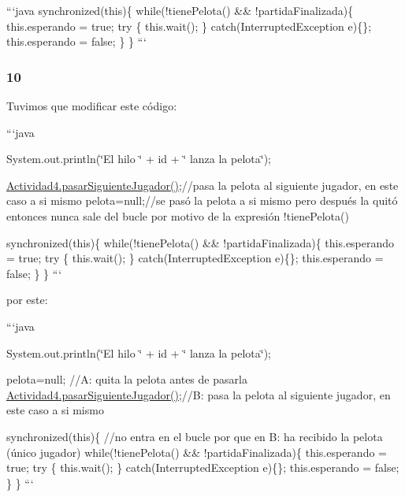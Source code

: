 ```java synchronized(this)\{ while(!tiene\-Pelota() \&\& !partida\-Finalizada)\{ this.\-esperando = true; try \{ this.\-wait(); \} catch(\-Interrupted\-Exception e)\{\}; this.\-esperando = false; \} \} ```

\subsubsection*{10}

Tuvimos que modificar este código\-:

```java

System.\-out.\-println(\char`\"{}\-El hilo \char`\"{} + id + \char`\"{} lanza la pelota\char`\"{});

\hyperlink{classActividad4_a23cf00e913eac32dea7597b617728047}{Actividad4.\-pasar\-Siguiente\-Jugador()};//pasa la pelota al siguiente jugador, en este caso a si mismo pelota=null;//se pasó la pelota a si mismo pero después la quitó entonces nunca sale del bucle por motivo de la expresión !tiene\-Pelota()

synchronized(this)\{ while(!tiene\-Pelota() \&\& !partida\-Finalizada)\{ this.\-esperando = true; try \{ this.\-wait(); \} catch(\-Interrupted\-Exception e)\{\}; this.\-esperando = false; \} \} ```

por este\-:

```java

System.\-out.\-println(\char`\"{}\-El hilo \char`\"{} + id + \char`\"{} lanza la pelota\char`\"{});

pelota=null; //\-A\-: quita la pelota antes de pasarla \hyperlink{classActividad4_a23cf00e913eac32dea7597b617728047}{Actividad4.\-pasar\-Siguiente\-Jugador()};//\-B\-: pasa la pelota al siguiente jugador, en este caso a si mismo

synchronized(this)\{ //no entra en el bucle por que en B\-: ha recibido la pelota (único jugador) while(!tiene\-Pelota() \&\& !partida\-Finalizada)\{ this.\-esperando = true; try \{ this.\-wait(); \} catch(\-Interrupted\-Exception e)\{\}; this.\-esperando = false; \} \} ``` 